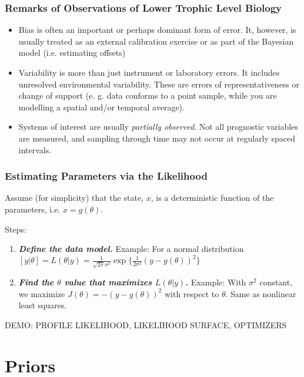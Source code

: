 \documentclass{beamer}
\renewcommand{\bf}{\bfseries}
\begin{document}
\frame%
{\frametitle{Remarks of Observations of Lower Trophic Level Biology}

\begin{itemize}
\pause
\item
Bias is often an important or perhaps dominant form of error. It, however, is usually treated as an external calibration exercise or as part of the Bayesian model (i.e. estimating offsets)
\pause
\item
Variability is more than just instrument or laboratory errors. It includes unresolved environmental variability. These are errors of representativeness or change of support (e. g. data conforms to a point sample, while you are modelling a spatial and/or temporal average). 
\pause
\item
Systems of interest are usually {\it partially observed}. Not all prognostic variables are measured, and sampling through time may not occur at regularly spaced intervals.
\end{itemize}
}

\frame%
{\frametitle{Estimating Parameters via the Likelihood}

Assume (for simplicity) that the state, $x$, is a deterministic function of the parameters, i.e. $x = g(\theta)$.

\pause
Steps:
\medskip
\begin{enumerate}
\pause
\item
{\it \bf Define the data model.} Example: For a normal distribution $[y | \theta] = L(\theta | y) = \frac{1}{\sqrt{2 \pi} \sigma^2} \exp \{ \frac{1}{2 \sigma^2} \left( y - g(\theta) \right)^2 \}$
\pause
\item
{\it \bf Find the $\theta$ value that maximizes $L(\theta | y)$.}  Example: With $\sigma^2$ constant,  we maximize  $ J (\theta) = -\left( y - g(\theta) \right)^2$ with respect to $\theta$. Same as nonlinear least squares. 
\end{enumerate}

\pause
\medskip
\color{red} DEMO: PROFILE LIKELIHOOD, LIKELIHOOD SURFACE, OPTIMIZERS

}

\section{Priors}
\end{document}
